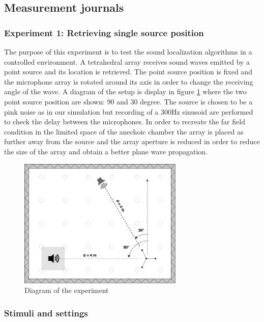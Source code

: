 \newpage

\subsection{Measurement journals}

\subsubsection{Experiment 1: Retrieving single source position}

The purpose of this experiment is to test the sound localization algorithms in a controlled environment. A tetrahedral array receives sound waves emitted by a point source and its location is  retrieved. The point source position is fixed and the microphone array is rotated around its axis in order to change the receiving angle of the wave. A diagram of the setup is display in figure \ref{fig:Anechoic1} where the two point source position are shown: 90 and 30 degree.  The source is chosen to be a pink noise as in our simulation but recording of a 300Hz sinusoid are performed to check the delay between the microphones. In order to recreate the far field condition in the limited space of the anechoic chamber the array is placed as further away from the source and the array aperture is reduced in order to reduce the size of the array and obtain a better plane wave propagation. 

\begin{figure}[H]
    \centering
    \includegraphics[width=0.7\textwidth]{Figures/Anechoicexp1.png}
    \caption{Diagram of the experiment}
    \label{fig:Anechoic1}
\end{figure}
 

\subsubsection{Stimuli and settings}


